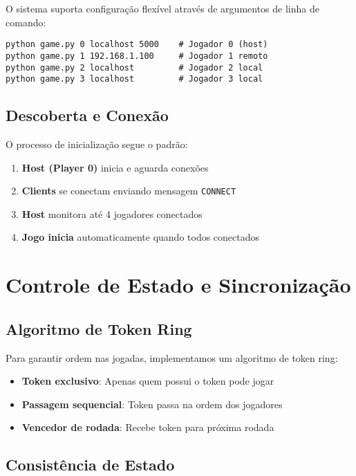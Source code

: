 \documentclass[12pt,a4paper]{article}
\begin{document}
O sistema suporta configuração flexível através de argumentos de linha de comando:

\begin{lstlisting}[caption=Exemplo de Execução]
python game.py 0 localhost 5000    # Jogador 0 (host)
python game.py 1 192.168.1.100     # Jogador 1 remoto
python game.py 2 localhost         # Jogador 2 local
python game.py 3 localhost         # Jogador 3 local
\end{lstlisting}

\subsection{Descoberta e Conexão}

O processo de inicialização segue o padrão:

\begin{enumerate}
    \item \textbf{Host (Player 0)} inicia e aguarda conexões
    \item \textbf{Clients} se conectam enviando mensagem \texttt{CONNECT}
    \item \textbf{Host} monitora até 4 jogadores conectados
    \item \textbf{Jogo inicia} automaticamente quando todos conectados
\end{enumerate}

\section{Controle de Estado e Sincronização}

\subsection{Algoritmo de Token Ring}

Para garantir ordem nas jogadas, implementamos um algoritmo de token ring:

\begin{itemize}
    \item \textbf{Token exclusivo}: Apenas quem possui o token pode jogar
    \item \textbf{Passagem sequencial}: Token passa na ordem dos jogadores
    \item \textbf{Vencedor de rodada}: Recebe token para próxima rodada
\end{itemize}

\subsection{Consistência de Estado}
\end{document}
